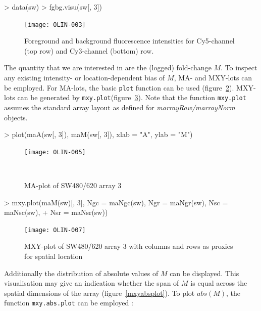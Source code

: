 \documentclass[a4paper,11pt]{article}
\begin{document}
\begin{Schunk}
\begin{Sinput}
> data(sw)
> fgbg.visu(sw[, 3])
\end{Sinput}
\end{Schunk}

\begin{figure}
\centering
\texttt{[image: OLIN-003]}
\caption{Foreground and background fluorescence intensities for Cy5-channel (top row) and Cy3-channel (bottom) row.}
\label{fgbg}
\end{figure}

The  quantity that we are interested in are the (logged) fold-change $M$. To inspect
any existing intensity- or location-dependent bias of $M$, MA- and MXY-lots can be employed.
For MA-lots, the basic \texttt{plot} function can be used (figure~\ref{maplot}). 
MXY-lots can be generated 
by \texttt{mxy.plot}(figure~\ref{mxyplot}). 
Note that the function   \texttt{mxy.plot} assumes the standard array
layout as defined for \textit{marrayRaw/marrayNorm} objects.
  
\begin{Schunk}
\begin{Sinput}
> plot(maA(sw[, 3]), maM(sw[, 3]), xlab = "A", ylab = "M")
\end{Sinput}
\end{Schunk}

\begin{figure}[t]
\centering
\texttt{[image: OLIN-005]}
\caption{MA-plot of SW480/620 array 3}\
\label{maplot}
\end{figure}


\begin{Schunk}
\begin{Sinput}
> mxy.plot(maM(sw)[, 3], Ngc = maNgc(sw), Ngr = maNgr(sw), Nsc = maNsc(sw), 
+     Nsr = maNsr(sw))
\end{Sinput}
\end{Schunk}

\begin{figure}[t]
\centering
\texttt{[image: OLIN-007]}
\caption{MXY-plot of SW480/620 array 3 with columns and rows as proxies for spatial location}
\label{mxyplot}
\end{figure}

Additionally the distribution of absolute values of $M$ can be displayed. This visualisation
may give an indication whether the span of $M$ is equal across the spatial dimensions of
the array (figure~\ref{mxyabsplot}). 
To plot $abs(M)$, the function \texttt{mxy.abs.plot} can be employed :
\end{document}
